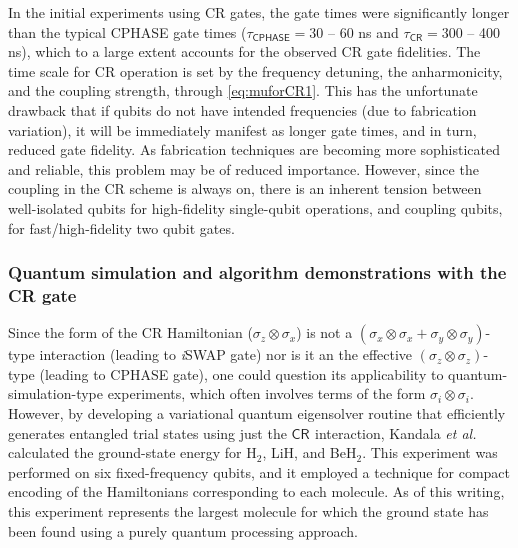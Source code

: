 \documentclass[aip,apr,twocolumn,showpacs,superscriptaddress,groupedaddress,nofootinbib,reprint]{revtex4-1}  %
\newcommand{\iSWAP}{\emph{i}\textsf{SWAP}}
\newcommand{\CPHASE}{\textsf{CPHASE}}
\newcommand{\ZX}[1]{\textsf{CR}_{#1}}
\newcommand{\CR}{\textsf{CR}}
\newcommand{\etal}{\emph{et al.}}
\begin{document}
In the initial experiments using \CR{} gates, the gate times were significantly longer than the typical \CPHASE{} gate times ($\tau_{\CPHASE{}}=30$ -- 60 ns and $\tau_{\CR} = 300$ -- 400 ns), which to a large extent accounts for the observed \CR{} gate fidelities. The time scale for \CR{} operation is set by the frequency detuning, the anharmonicity, and the coupling strength, through \cref{eq:muforCR1}. This has the unfortunate drawback that if qubits do not have intended frequencies (due to fabrication variation), it will be immediately manifest as longer gate times, and in turn, reduced gate fidelity. As fabrication techniques are becoming more sophisticated and reliable, this problem may be of reduced importance. However, since the coupling in the \CR{} scheme is always on, there is an inherent tension between well-isolated qubits for high-fidelity single-qubit operations, and coupling qubits, for fast/high-fidelity two qubit gates.

\subsubsection{Quantum simulation and algorithm demonstrations with the \CR{} gate}
Since the form of the \CR{} Hamiltonian ($\sigma_z\otimes\sigma_x$) is not a $(\sigma_x\otimes\sigma_x + \sigma_y\otimes \sigma_y)$-type interaction (leading to \iSWAP{} gate) nor is it an the effective $(\sigma_z\otimes\sigma_z)$-type (leading to \CPHASE{} gate), one could question its applicability to quantum-simulation-type experiments, which often involves terms of the form $\sigma_i\otimes\sigma_i$. However, by developing a variational quantum eigensolver routine that efficiently generates entangled trial states using just the $\ZX{}$ interaction, Kandala \etal \cite{Kandala2017} calculated the ground-state energy for H$_2$, LiH, and BeH$_2$. This experiment was performed on six fixed-frequency qubits, and it employed a technique for compact encoding of the Hamiltonians corresponding to each molecule\cite{Bravyi2017}. As of this writing, this experiment represents the largest molecule for which the ground state has been found using a purely quantum processing approach.
\end{document}
